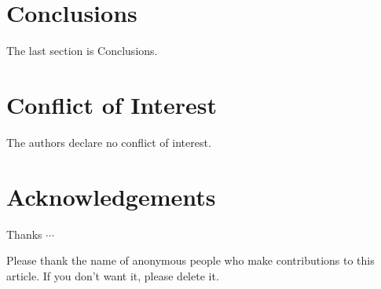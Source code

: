 \documentclass{jssc}
\begin{document}
\section{Conclusions}

The last section is Conclusions.

\section*{Conflict of Interest}

The authors declare no conflict of interest.










\section*{Acknowledgements}
{\rm Thanks $\cdots$}

Please thank the name of anonymous people who make contributions to
this article. If you don't want it, please delete it.
\end{document}
